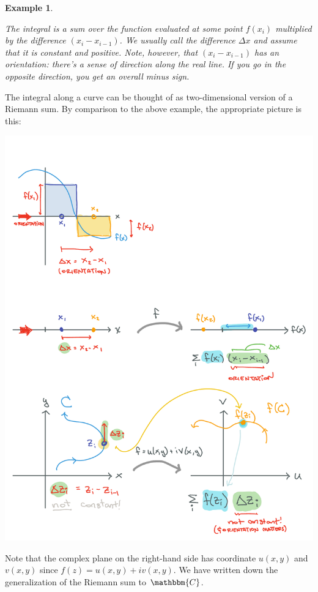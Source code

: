 \documentclass[
  11pt,
	colorful,
	raggedright,
]{tufte-style-thesis-flip}
\newtheorem{example}{Example}[section]
\begin{document}
\begin{example}
\begin{center}
\end{center}
The integral is a sum over the function evaluated at some point $f(x_i)$ multiplied by the difference $(x_i-x_{i-1})$. We usually call the difference $\Delta x$ and assume that it is constant and positive. Note, however, that $(x_i-x_{i-1})$ has an \emph{orientation}: there's a sense of direction along the real line. If you go in the opposite direction, you get an overall minus sign.
\end{example}



The integral along a curve can be thought of as two-dimensional version of a Riemann sum. By comparison to the above example, the appropriate picture is this:
\begin{center}
\includegraphics[width=.7\textwidth]{figures/Complex_06_CRiem.pdf}
\end{center}
Note that the complex plane on the right-hand side has coordinate $u(x,y)$ and $v(x,y)$ since $f(z) = u(x,y) + i v(x,y)$. We have written down the generalization of the Riemann sum to $\mathbbm{C}$. 
\end{document}
